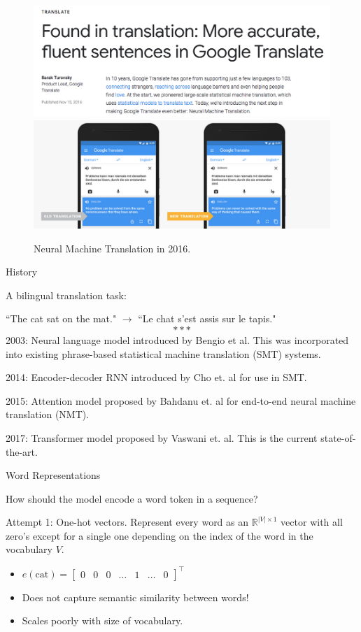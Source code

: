 \documentclass[english]{article}
\begin{document}
\begin{figure}
\centering
\includegraphics[height=0.3\linewidth]{gt1.png}
\vspace{5mm}
\includegraphics[height=0.3\linewidth]{gt2.png}
    \caption{Neural Machine Translation in 2016.}
    \label{Neural Machine Translation in 2016}
\end{figure}
 
\item 
 {History}

A bilingual translation task:

``The cat sat on the mat." $\rightarrow$ ``Le chat s'est assis sur le tapis."
$$***$$
2003: Neural language model introduced by Bengio et al. This was incorporated into existing phrase-based statistical machine translation (SMT) systems.

2014: Encoder-decoder RNN introduced by Cho et. al for use in SMT.

2015: Attention model proposed by Bahdanu et. al for end-to-end neural machine translation (NMT).

2017: Transformer model proposed by Vaswani et. al. This is the current state-of-the-art.
 

\item 
 {Word Representations}

How should the model encode a word token in a sequence?
 
Attempt 1: One-hot vectors. Represent every word as an $\mathbb{R}^{|V|\times 1}$ vector with all zero's except for a single one depending on the index of the word in the vocabulary $V$.
\begin{itemize}
\item $e(\text{cat})=\left[\begin{smallmatrix}
0 & 0 & 0 & \dots & 1 & \dots & 0
\end{smallmatrix}\right]^\top$
\item Does not capture semantic similarity between words!
\item Scales poorly with size of vocabulary.
\end{itemize}
 
\end{document}
